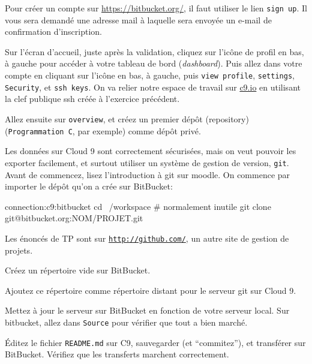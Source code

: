 
Pour créer un compte sur \url{https://bitbucket.org/}, il faut
utiliser le lien \texttt{sign up}. Il vous sera demandé une adresse
mail à laquelle sera envoyée un e-mail de confirmation d'inscription.


\question Sur l'écran d'accueil, juste après la validation, cliquez
sur l'icône de profil en bas, à gauche pour accéder à votre tableau de
bord (\emph{dashboard}). Puis allez dans votre compte en cliquant sur
l'icône en bas, à gauche, puis \texttt{view profile},
\texttt{settings}, \texttt{Security}, et \texttt{ssh keys}. On va
relier notre espace de travail sur \url{c9.io} en utilisant la clef
publique ssh créée à l'exercice précédent.

\question Allez ensuite sur \texttt{overview}, et créez un premier
dépôt (repository) (\texttt{Programmation C}, par exemple) comme dépôt
privé. 


Les données sur Cloud 9 sont correctement sécurisées, mais on veut
pouvoir les exporter facilement, et surtout utiliser un système de
gestion de version, \texttt{git}. Avant de commencez, lisez
l'introduction à git sur moodle. On commence par importer le dépôt
qu'on a crée sur BitBucket:

\begin{solution}
  \begin{bash}{connection:c9:bitbucket}
    cd ~/workspace # normalement inutile
    git clone git@bitbucket.org:NOM/PROJET.git
  \end{bash}
\end{solution}





Les énoncés de TP sont sur \texttt{\url{http://github.com/}}, un autre site
de gestion de projets.


\question Créez un répertoire vide sur BitBucket.

\question Ajoutez ce répertoire comme répertoire distant pour le
serveur git sur Cloud 9.

\question Mettez à jour le serveur sur BitBucket en fonction de votre
serveur local.  Sur bitbucket, allez dans \texttt{Source} pour
vérifier que tout a bien marché.

\question Éditez le fichier \texttt{README.md} sur C9, sauvegarder (et
``commitez''), et transférer sur BitBucket. Vérifiez que les
transferts marchent correctement.
